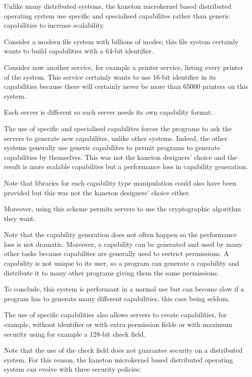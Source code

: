 \begin{multicols}{2}
Unlike many distributed systems, the kaneton microkernel based
distributed operating system use specific and specialised capabilites
rather than generic capabilities to increase scalability.

Consider a modern file system with billions of inodes; this file system
certainly wants to build capabilities with a 64-bit identifier.

Consider now another service, for example a printer service, listing
every printer of the system. This service certainly wants to use 16-bit
identifier in its capabilities because there will certainly never be more
than 65000 printers on this system.

Each server is different so each server needs its own capability format.

The use of specific and specialised capabilites forces the programs to ask
the servers to generate new capabilites, unlike other systems. Indeed,
the other systems generally use generic capabilites to permit programs to
generate capabilities by themselves. This was not the kaneton designers'
choice and the result is more scalable capabilites but a performance loss
in capability generation.

Note that libraries for each capability type manipulation could also have
been provided but this was not the kaneton designers' choice either.

Moreover, using this scheme permits servers to use the cryptographic
algorithm they want.

Note that the capability generation does not often happen so the performance
loss is not dramatic. Moreover, a capability can be generated and used
by many other tasks because capabilites are generally used to restrict
permissions. A capability is not unique to its user, so a program can
generate a capability and distribute it to many other programs giving
them the same permissions.

To conclude, this system is performant in a normal use but can become
slow if a program has to generate many different capabilities, this case
being seldom.

The use of specific capabilities also allows servers to create capabilities,
for example, without identifier or with extra permission fields or with
maximum security using for example a 128-bit check field.

Note that the use of the check field does not guarantee security on a
distributed system. For this reason, the kaneton microkernel based
distributed operating system can evolve with three security policies:


\end{multicols}
